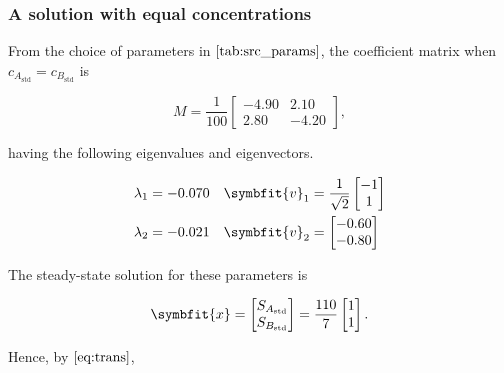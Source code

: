 \subsubsection{A solution with equal concentrations}\label{sec:eq_conc}

From the choice of parameters in \(\autoref{tab:src_params}\), the
coefficient matrix when \(c_{A_{\text{std}}} = c_{B_{\text{std}}}\) is

\begin{equation}
  M = \frac{1}{100}\begin{bmatrix}
        -4.90 & 2.10\\ 2.80 & -4.20
      \end{bmatrix},
\end{equation}

having the following eigenvalues and eigenvectors.

\begin{align*}
  \lambda_1 &= -0.070 & \symbfit{v}_1 &= \frac{1}{\sqrt{2}}\begin{bmatrix} -1 \\ 1 \end{bmatrix} \\
  \lambda_2 &= -0.021 & \symbfit{v}_2 &= \begin{bmatrix} -0.60 \\ -0.80 \end{bmatrix}
\end{align*}

The steady-state solution for these parameters is

\begin{equation}
  \symbfit{x} = \begin{bmatrix}
                  S_{A_{\text{std}}} \\
                  S_{B_{\text{std}}}
                \end{bmatrix} = \frac{110}{7}\begin{bmatrix}
              1 \\
              1
            \end{bmatrix}.
\end{equation}

Hence, by \(\autoref{eq:trans}\),

